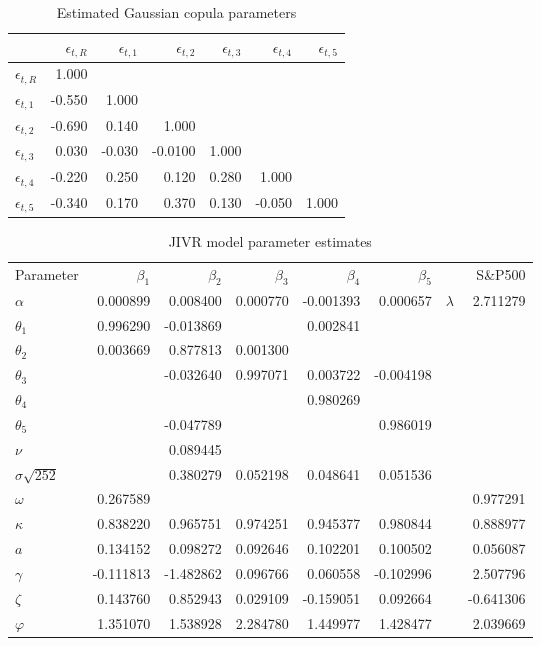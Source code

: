 \begin{table}[H]
\centering
\renewcommand{\arraystretch}{1.5}
\caption{Estimated Gaussian copula parameters}
\begin{tabular}{lrrrrrr}
\toprule
 & $\epsilon_{t,R}$ & $\epsilon_{t,1}$ & $\epsilon_{t,2}$ & $\epsilon_{t,3}$ & $\epsilon_{t,4}$ & $\epsilon_{t,5}$ \\
\midrule
$\epsilon_{t,R}$ & 1.000 &  &  &  & &  \\
$\epsilon_{t,1}$ & -0.550 & 1.000 &  &  &  &  \\
$\epsilon_{t,2}$ & -0.690 & 0.140 & 1.000 &  & &  \\
$\epsilon_{t,3}$ & 0.030 & -0.030 & -0.0100 & 1.000 &  &  \\
$\epsilon_{t,4}$ & -0.220 & 0.250 & 0.120 & 0.280 & 1.000 &  \\
$\epsilon_{t,5}$ & -0.340 & 0.170 & 0.370 & 0.130 & -0.050 & 1.000 \\
\bottomrule
\end{tabular}
\end{table}

\begin{table}[H]
\centering
\renewcommand{\arraystretch}{1.5}
\caption{ JIVR model parameter estimates }
\begin{tabular}{lrrrrrrr}
\toprule
Parameter  & $\beta_1$ & $\beta_2$ & $\beta_3$ & $\beta_4$ & $\beta_5$ & & S\&P500 \\
\cline{1-6}\cline{8-8}
$\alpha$ & 0.000899 & 0.008400 & 0.000770 & -0.001393 & 0.000657 & $\lambda$ & 2.711279 \\
$\theta_1$ & 0.996290 & -0.013869 &  & 0.002841 &  &  &\\
$\theta_2$ & 0.003669 & 0.877813 & 0.001300 &  &  &  &\\
$\theta_3$ &  & -0.032640 & 0.997071 & 0.003722 & -0.004198 &  &\\
$\theta_4$ &  &  &  & 0.980269 &  &  &\\
$\theta_5$ &  & -0.047789 &  &  & 0.986019 &  &\\
$\nu$ &  & 0.089445 &  &  &  &  &\\
$\sigma\sqrt{252}$ &  & 0.380279 & 0.052198 & 0.048641 & 0.051536 &  &\\
$\omega$ & 0.267589 &  &  &  &  & & 0.977291 \\
$\kappa$ & 0.838220 & 0.965751 & 0.974251 & 0.945377 & 0.980844 & & 0.888977 \\
$a$ & 0.134152 & 0.098272 & 0.092646 & 0.102201 & 0.100502 & & 0.056087 \\
$\gamma$ & -0.111813 & -1.482862 & 0.096766 & 0.060558 & -0.102996 & & 2.507796 \\
$\zeta$ & 0.143760 & 0.852943 & 0.029109 & -0.159051 & 0.092664 & & -0.641306 \\
$\varphi$ & 1.351070 & 1.538928 & 2.284780 & 1.449977 & 1.428477 & & 2.039669 \\
\bottomrule
\end{tabular}
\end{table}

